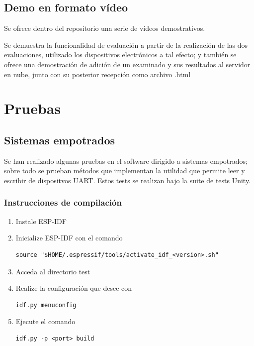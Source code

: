 \documentclass[12pt,a4paper,twoside,openright]{book}
\begin{document}
\section{Demo en formato vídeo}

Se ofrece dentro del repositorio una serie de vídeos demostrativos. \cite{repo1}

Se demuestra la funcionalidad de evaluación a partir de la realización de las dos evaluaciones, utilizado los dispositivos electrónicos a tal efecto; y también se ofrece una demostración de adición de un examinado y sus resultados al servidor en nube, junto con su posterior recepción como archivo .html

\chapter{Pruebas}

\section{Sistemas empotrados}

Se han realizado algunas pruebas en el software dirigido a sistemas empotrados; sobre todo se prueban métodos que implementan la utilidad que permite leer y escribir de dispositvos UART. Estos tests se realizan bajo la suite de tests Unity.

\subsection{Instrucciones de compilación}

\begin{enumerate}
  \item Instale ESP-IDF
  \item Inicialize ESP-IDF con el comando \begin{verbatim}source "$HOME/.espressif/tools/activate_idf_<version>.sh"\end{verbatim} 
  \item Acceda al directorio test
  \item Realize la configuración que desee con \begin{verbatim}idf.py menuconfig\end{verbatim}
  \item Ejecute el comando \begin{verbatim}idf.py -p <port> build\end{verbatim}
\end{enumerate}
\end{document}
